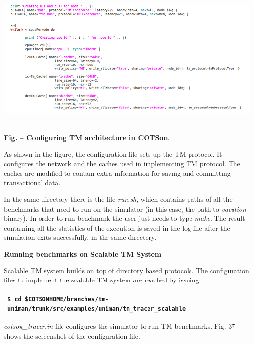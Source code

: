 \documentclass[a4paper]{article}
\newcounter{Figure}
\renewcommand\theFigure{\arabic{Figure}}
\begin{document}
{\centering 
\includegraphics[width=6.2661in,height=2.7862in]{img52.png}
\par}

{\centering{}\sffamily\bfseries
\label{bkm:Ref388170901}Fig.
\stepcounter{Figure}{\theFigure} -- Configuring TM architecture in
COTSon.
\par}

{
As shown in the figure, the configuration file sets up the TM protocol.
It configures the network and the caches used in implementing TM
protocol. The caches are modified to contain extra information for
saving and committing transactional data.}

{
In the same directory there is the file \textit{run.sh}, which contains
paths of all the benchmarks that need to run on the simulator (in this
case, the path to \textit{vacation} binary). In order to run benchmark
the user just needs to type \textit{make}. The result containing all
the statistics of the execution is saved in the log file after the
simulation exits successfully, in the same directory.}

{
\textbf{Running benchmarks on Scalable TM System }}

{
Scalable TM system builds on top of directory based protocols. The
configuration files to implement the scalable TM system are reached by
issuing:}

\begin{flushleft}
\tablehead{}
\begin{supertabular}{|m{6.29346in}|}
\hline
{} \texttt{\$ cd
\$COTSONHOME/branches/tm-uniman/trunk/src/examples/uniman/tm\_tracer\_scalable}\\\hline
\end{supertabular}
\end{flushleft}
{
\textit{cotson\_tracer.in} file configures the simulator to run TM
benchmarks. Fig. 37 shows the screenshot of the configuration file.}
\end{document}
